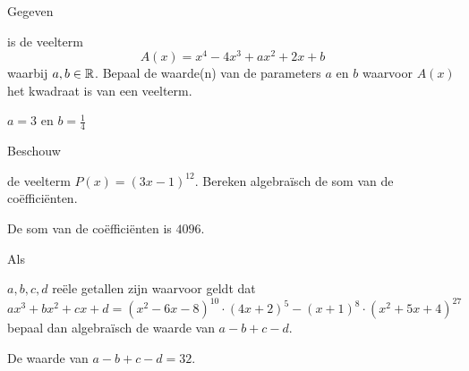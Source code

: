 \documentclass{ximera}
\begin{document}
\begin{exercise}\setcounter{enumi}{16} 
\hypertarget{oef1.16}{Gegeven} is de veelterm
\[
A(x) = x^4 - 4x^3 + ax^2 + 2x + b
\]
waarbij $a,b \in \mathbb{R}$. Bepaal de waarde(n) van de parameters $a$ en $b$ waarvoor $A(x)$ het kwadraat is van een veelterm. 
\begin{oplossing} \(a = 3\) en \(b = \frac{1}{4}\) \end{oplossing}
\end{exercise}

\begin{exercise}\setcounter{enumi}{17} 
\hypertarget{oef1.17}{Beschouw} de veelterm $P(x) = (3x - 1)^{12}$. Bereken algebraïsch de som van de coëfficiënten. 
\begin{oplossing} De som van de coëfficiënten is $4096$. \end{oplossing}
\end{exercise}

\begin{exercise}\setcounter{enumi}{18} 
\hypertarget{oef1.18}{Als} $a,b,c,d$ reële getallen zijn waarvoor geldt dat
\[
ax^3 + bx^2 + cx + d = (x^2-6x-8)^{10}\cdot(4x+2)^5 - (x+1)^8\cdot(x^2+5x+4)^{27}
\]
bepaal dan algebraïsch de waarde van $a-b+c-d$.
\begin{oplossing} De waarde van \(a-b+c-d = 32\).\end{oplossing}
\end{exercise}
\end{document}
